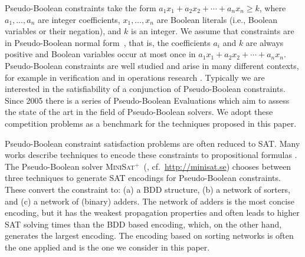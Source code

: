 \documentclass[envcountsame]{llncs}
\newcommand\minisatp{\textsc{MiniSat$^+$}}
\begin{document}
Pseudo-Boolean constraints take the form $a_1x_1 + a_2x_2 + \cdots +
a_nx_n \geq k$, where $a_1,\ldots, a_n$ are integer coefficients,
$x_1,\ldots,x_n$ are Boolean literals (i.e., Boolean variables or
their negation), and $k$ is an integer.  We assume that constraints
are in Pseudo-Boolean normal form~\cite{Barth95}, that is, the
coefficients $a_i$ and $k$ are always positive and Boolean
variables occur at most once in $a_1x_1 + a_2x_2 + \cdots + a_nx_n$.
Pseudo-Boolean constraints are well studied and arise in many
different contexts, for example in verification \cite{Bryant02} and in
operations research \cite{Bixby92}.  Typically we are interested in
the satisfiability of a conjunction of Pseudo-Boolean constraints.
Since 2005 there is a series of Pseudo-Boolean Evaluations
\cite{Manquinho06} 
which aim to assess the state of the art in the field of
Pseudo-Boolean solvers. We adopt these competition problems as a
benchmark for the techniques proposed in this paper.

Pseudo-Boolean constraint satisfaction problems are often reduced to
SAT. 
Many works describe techniques to encode these constraints to
propositional formulas \cite{BailleuxBR06,BailleuxBR09,EenS06}.
The Pseudo-Boolean solver \minisatp\ (\cite{EenS06}, cf.\
\url{http://minisat.se}) chooses between three techniques to
generate SAT encodings for Pseudo-Boolean constraints. These convert
the constraint to: (a) a BDD structure, (b) a network of sorters, and
(c) a network of (binary) adders. The network of adders is the most
concise encoding, but it has the weakest propagation properties and
often leads to higher SAT solving times
than the BDD based encoding, which, on the other hand,
generates the largest encoding. The encoding based on sorting networks
is often the one applied and is the one we consider in this paper.
\end{document}
